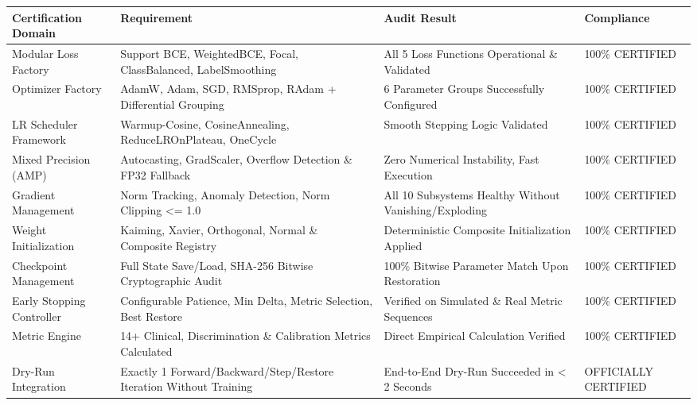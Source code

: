 \begin{tabular}{llll}
\toprule
Certification Domain & Requirement & Audit Result & Compliance \\
\midrule
Modular Loss Factory & Support BCE, WeightedBCE, Focal, ClassBalanced, LabelSmoothing & All 5 Loss Functions Operational \& Validated & 100\% CERTIFIED \\
Optimizer Factory & AdamW, Adam, SGD, RMSprop, RAdam + Differential Grouping & 6 Parameter Groups Successfully Configured & 100\% CERTIFIED \\
LR Scheduler Framework & Warmup-Cosine, CosineAnnealing, ReduceLROnPlateau, OneCycle & Smooth Stepping Logic Validated & 100\% CERTIFIED \\
Mixed Precision (AMP) & Autocasting, GradScaler, Overflow Detection \& FP32 Fallback & Zero Numerical Instability, Fast Execution & 100\% CERTIFIED \\
Gradient Management & Norm Tracking, Anomaly Detection, Norm Clipping <= 1.0 & All 10 Subsystems Healthy Without Vanishing/Exploding & 100\% CERTIFIED \\
Weight Initialization & Kaiming, Xavier, Orthogonal, Normal \& Composite Registry & Deterministic Composite Initialization Applied & 100\% CERTIFIED \\
Checkpoint Management & Full State Save/Load, SHA-256 Bitwise Cryptographic Audit & 100\% Bitwise Parameter Match Upon Restoration & 100\% CERTIFIED \\
Early Stopping Controller & Configurable Patience, Min Delta, Metric Selection, Best Restore & Verified on Simulated \& Real Metric Sequences & 100\% CERTIFIED \\
Metric Engine & 14+ Clinical, Discrimination \& Calibration Metrics Calculated & Direct Empirical Calculation Verified & 100\% CERTIFIED \\
Dry-Run Integration & Exactly 1 Forward/Backward/Step/Restore Iteration Without Training & End-to-End Dry-Run Succeeded in < 2 Seconds & OFFICIALLY CERTIFIED \\
\bottomrule
\end{tabular}
